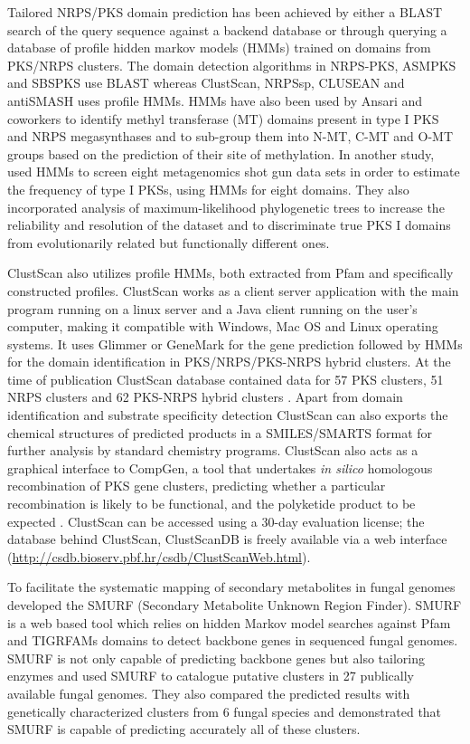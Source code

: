 \begin{doublespacing}
		Tailored NRPS/PKS domain prediction has been achieved by either a BLAST \parencite{Altschul1990} search of the query sequence against a backend database or through querying a database of profile hidden markov models (HMMs) trained on domains from PKS/NRPS clusters. The domain detection algorithms in NRPS-PKS, ASMPKS and SBSPKS use BLAST whereas ClustScan, NRPSsp, CLUSEAN and antiSMASH uses profile HMMs. HMMs have also been used by Ansari and coworkers \parencite{Ansari2008} to identify methyl transferase (MT) domains present in type I PKS and NRPS megasynthases and to sub-group them into N-MT, C-MT and O-MT groups based on the prediction of their site of methylation. In another study,  \textcite{Foerstner2008} used HMMs to screen eight metagenomics shot gun data sets in order to estimate the frequency of type I PKSs, using HMMs for eight domains. They also incorporated analysis of maximum-likelihood phylogenetic trees to increase the reliability and resolution of the dataset and to discriminate true PKS I domains from evolutionarily related but functionally different ones. 
		
		ClustScan \parencite{Starcevic2008} also utilizes profile HMMs, both extracted from Pfam and specifically constructed profiles. ClustScan works as a client server application with the main program running on a linux server and a Java client running on the user's computer, making it compatible with Windows, Mac OS and Linux operating systems. It uses Glimmer or GeneMark for the gene prediction followed by HMMs for the domain identification in PKS/NRPS/PKS-NRPS hybrid clusters. At the time of publication ClustScan database contained data for 57 PKS clusters, 51 NRPS clusters and 62 PKS-NRPS hybrid clusters \parencite{Starcevic2008}. Apart from domain identification and substrate specificity detection ClustScan can also exports the chemical structures of predicted products in a SMILES/SMARTS format for further analysis by standard chemistry programs. ClustScan also acts as a graphical interface to CompGen, a tool that undertakes \textit{in silico} homologous recombination of PKS gene clusters, predicting whether a particular recombination is likely to be functional, and the polyketide product to be expected \parencite{Starcevic2012}. ClustScan can be accessed using a 30-day evaluation license; the database behind ClustScan, ClustScanDB is freely available via a web interface (\url{http://csdb.bioserv.pbf.hr/csdb/ClustScanWeb.html}).
		
		To facilitate the systematic mapping of secondary metabolites in fungal genomes \textcite{Khaldi2010} developed the SMURF (Secondary Metabolite Unknown Region Finder). SMURF is a web based tool which relies on hidden Markov model searches against Pfam and TIGRFAMs \parencite{Haft2001} domains to detect backbone genes in sequenced fungal genomes. SMURF is not only capable of predicting backbone genes but also tailoring enzymes and \textcite{Khaldi2010} used SMURF to catalogue putative clusters in 27 publically available fungal genomes. They also compared the predicted results with genetically characterized clusters from 6 fungal species and demonstrated that SMURF is capable of predicting accurately all of these clusters. 
		

\end{doublespacing}
